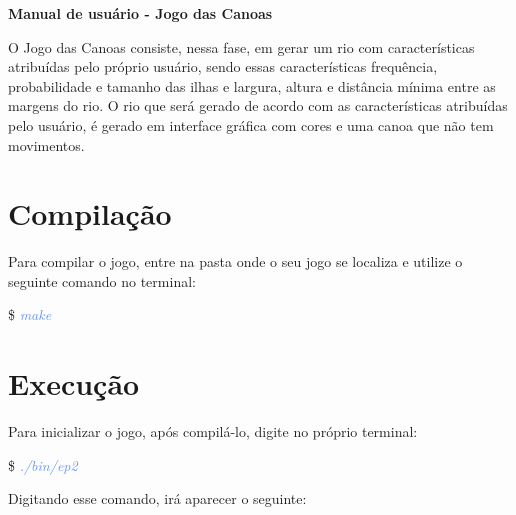 \documentclass[a4paper,12pt]{article}
\begin{document}
  \begin{center} 
	{\LARGE \textcolor{NavyBlue}{ \textbf{Manual de usuário - Jogo das Canoas}}}
  \end{center}

  \bigskip
  \bigskip

  O Jogo das Canoas consiste, nessa fase, em gerar um rio com 
  características atribuídas pelo próprio usuário, sendo essas características 
  frequência, probabilidade e tamanho das ilhas e largura, altura e distância
  mínima entre as margens do rio. O rio que será gerado de acordo com as 
  características atribuídas pelo usuário, é gerado em 
  interface gráfica com cores e uma canoa que não tem movimentos.


\newpage %
\section{\textcolor{NavyBlue}{Compilação}}

Para compilar o jogo, entre na pasta onde o seu jogo se localiza e utilize o seguinte comando no terminal:

\$ \textcolor{CornflowerBlue}{\textit{make}}

\bigskip
\section{\textcolor{NavyBlue}{Execução}}

  Para inicializar o jogo, após compilá-lo, digite no próprio terminal:
  
  \$ \textcolor{CornflowerBlue}{\textit{./bin/ep2}}
  
  Digitando esse comando, irá aparecer o seguinte:
\end{document}
